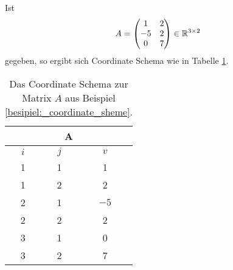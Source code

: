\begin{bsp}
    \label{besipiel:_coordinate_sheme}
    Ist
    \begin{equation*}
        A=\begin{pmatrix}
            1 & 2 \\
            -5 & 2 \\
            0 & 7 \\
        \end{pmatrix}
        \in \mathbb{R}^{3 \times 2}
    \end{equation*}
    gegeben, so ergibt sich Coordinate Schema wie in Tabelle \ref{coordinate_scheme_table}.

\begin{table}
    \centering
    \begin{tabular}{|c|c|c|} 
        \hline
    \multicolumn{3}{|c|}{\textbf{A}} \\ \hline
     \hline
     $i$ &$j$ &$v$ \\ 
     \hline
     1 &1 &1\\ 
     \hline
     1 &2 &2\\
     \hline
     2 &1 &$-5$\\
     \hline
     2 &2 &2\\
     \hline
     3 &1 &0\\
     \hline
     3 &2 &7\\
     \hline
    \end{tabular}
    \caption[coordinate]{Das Coordinate Schema zur Matrix $A$ aus Beispiel \ref{besipiel:_coordinate_sheme}.}
    \label{coordinate_scheme_table}
\end{table}
\end{bsp}

